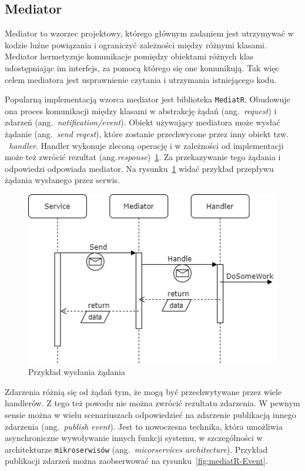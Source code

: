 \subsection{Mediator}
\label{subsec:mediator}

Mediator to wzorzec projektowy, którego głównym zadaniem jest utrzymywać w kodzie luźne powiązania i ograniczyć zależności między różnymi klasami. Mediator hermetyzuje komunikacje pomiędzy obiektami różnych klas udostępniając im interfejs, za pomocą którego się one komunikują. Tak więc celem mediatora jest usprawnienie czytania i utrzymania istniejącego kodu.

Popularną implementacją wzorca mediator jest biblioteka \texttt{MediatR}. Obudowuje ona proces komunikacji między klasami w abstrakcję żądań (ang.~\emph{request}) i zdarzeń (ang.~\emph{notification/event}). Obiekt używający mediatora może wysłać żądanie (ang.~\emph{send reqest}), które zostanie przechwycone przez inny obiekt tzw. ~\emph{handler}. Handler wykonuje zleconą operację i w zależności od implementacji może też zwrócić rezultat (ang.\emph{response})~\ref{fig:mediatR-Request}. Za przekazywanie tego żądania i odpowiedzi odpowiada mediator. Na rysunku~\ref{fig:mediatR-Request} widać przykład przepływu żądania wysłanego przez serwis.

\begin{figure}
	\centering
	\includegraphics[width=.6\linewidth]{rys02/mediatR-Command.png}
	\caption{Przykład wysłania żądania}
	\label{fig:mediatR-Request}
\end{figure}

Zdarzenia różnią się od żądań tym, że mogą być przechwytywane przez wiele handlerów. Z tego też powodu nie można zwrócić rezultatu zdarzenia. W pewnym sensie można w wielu scenariuszach odpowiedzieć na zdarzenie publikacją innego zdarzenia (ang.~\emph{publish event}). Jest to nowoczesna technika, która umożliwia asynchroniczne wywoływanie innych funkcji systemu, w szczególności w architekturze \texttt{mikroserwisów} (ang.~\emph{micorservices architecture}). Przykład publikacji zdarzeń można zaobserwować na rysunku~\ref{fig:mediatR-Event}.

